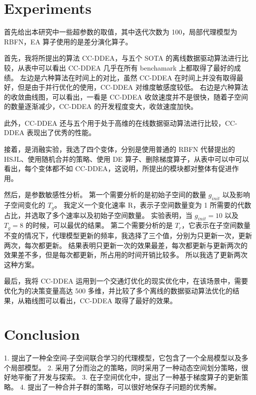 \documentclass[
  UTF8,
  twoside,
  zihao=5,
  scheme=plain,
  heading=true,
]{ctexart}
\begin{document}
\section{Experiments}

首先给出本研究中一些超参数的取值，其中迭代次数为 100，局部代理模型为 RBFN，EA 算子使用的是差分演化算子。

首先，我将所提出的算法 CC-DDEA，与五个 SOTA 的离线数据驱动算法进行比较，从表中可以看出 CC-DDEA 几乎在所有 benchamark 上都取得了最好的成绩。
左边是六种算法在时间上的对比，虽然 CC-DDEA 在时间上并没有取得最好，但是由于并行优化的使用，CC-DDEA 对维度敏感度较低。
右边是六种算法的收敛曲线图，可以看出，一看是 CC-DDEA 收敛速度并不是很快，随着子空间的数量逐渐减少，CC-DDEA 的开发程度变大，收敛速度加快。

此外，CC-DDEA 还与五个用于处于高维的在线数据驱动算法进行比较，CC-DDEA 表现出了优秀的性能。

接着，是消融实验，我选了四个变体，分别是使用普通的 RBFN 代替提出的 HSJL、使用随机合并的策略、使用 DE 算子、删除梯度算子，从表中可以中可以看出，每个变体都不如 CC-DDEA，这说明，所提出的模块都对整体有促进作用。

然后，是参数敏感性分析。
第一个需要分析的是初始子空间的数量 $g_{init}$ 以及影响子空间变化的 $T_g$。
我定义一个变化速率 R，表示子空间数量变为 1 所需要的代数占比，并选取了多个速率以及初始子空间数量。
实验表明，当 $g_{init} = 10$ 以及 $T_g = 8$ 的时候，可以最优的结果。
第二个需要分析的是 $T_r$，它表示在子空间数量不变的情况下，代理模型更新的频率，我选择了三个值，分别为只更新一次，更新两次，每次都更新。
结果表明只更新一次的效果最差，每次都更新与更新两次的效果差不多，但是每次都更新，所占用的时间开销比较多。
所以我选了更新两次这种方案。

最后，我将 CC-DDEA 运用到一个交通灯优化的现实优化中，在该场景中，需要优化为的决策变量高达 500 多维，并比较了多个离线的数据驱动算法优化的结果，从箱线图可以看出，CC-DDEA 取得了最好的效果。

\section{Conclusion}

1. 提出了一种全空间-子空间联合学习的代理模型，它包含了一个全局模型以及多个局部模型。
2. 采用了分而治之的策略，同时采用了一种动态空间划分策略，很好地平衡了开发与探索。
3. 在子空间优化中，提出了一种基于梯度算子的更新策略。
4. 提出了一种合并子群的策略，可以很好地保存子问题的优秀解。
\end{document}
